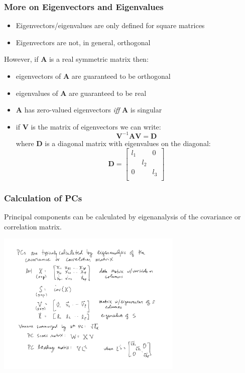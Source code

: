 \documentclass{beamer}
\newcommand{\Mtx}[1]{\ensuremath{\mathbf{#1}}}
\newcommand{\Inv}[1]{\ensuremath{#1^{-1}}}
\begin{document}
\begin{frame}
  \frametitle{More on Eigenvectors and Eigenvalues}

\begin{itemize}
 	\item Eigenvectors/eigenvalues are only defined for square matrices
	\item Eigenvectors are not, in general, orthogonal
\end{itemize}
\smallskip

However, if $\Mtx{A}$ is a real symmetric matrix then:
\begin{itemize}
	\item eigenvectors of $\Mtx{A}$ are guaranteed to be orthogonal
	\item eigenvalues of $\Mtx{A}$ are guaranteed to be real
	\item $\Mtx{A}$ has zero-valued eigenvectors \emph{iff} $\Mtx{A}$ is singular
	\item if $\Mtx{V}$ is the matrix of eigenvectors we can write:
\[
	\Inv{\Mtx{V}} \Mtx{A} \Mtx{V} = \Mtx{D}
\]
where $\Mtx{D}$ is a diagonal matrix with eigenvalues on the diagonal:
\footnotesize{
\[\Mtx{D} = 
 \left[ \begin{array}{rrr}
l_1 &  & 0 \\
       & l_2 & \\
 0      &        &  l_3\\
\end{array}
\right]
\]
} %

\end{itemize}



\end{frame}

\begin{frame}[fragile]
  \frametitle{Calculation of PCs}

Principal components can be calculated by eigenanalysis of the covariance or correlation matrix.
\medskip


\begin{center}
\includegraphics[height=2.7in]{pca-eigen}
\end{center}  


\end{frame}
\end{document}

